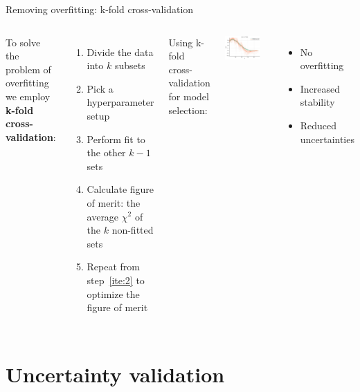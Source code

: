 \documentclass[aspectratio=169,10pt]{beamer}
\begin{document}
\begin{frame}{Removing overfitting: k-fold cross-validation}
\begin{columns}
To solve the problem of overfitting we employ \textbf{k-fold cross-validation}:
\begin{enumerate}
    \item Divide the data into $k$ subsets
    \item \label{ite:2} Pick a hyperparameter setup
    \item Perform fit to the other $k-1$ sets
    \item Calculate figure of merit: the average $\chi^2$ of the $k$ non-fitted sets
    \item Repeat from step~\ref{ite:2} to optimize the figure of merit
\end{enumerate}


Using k-fold cross-validation for model selection:

\includegraphics[width=0.8\textwidth]{methodology/no_overfit}

\begin{itemize}
    \item No overfitting
    \item Increased stability
    \item Reduced uncertainties 
\end{itemize}
\end{columns}
\end{frame}



\section{Uncertainty validation}
\end{document}
